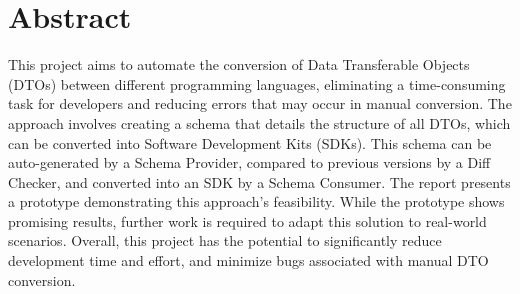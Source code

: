 \section*{Abstract}
This project aims to automate the conversion of Data Transferable Objects (DTOs) between different programming languages, eliminating a time-consuming task for developers and reducing errors that may occur in manual conversion. 
The approach involves creating a schema that details the structure of all DTOs, which can be converted into Software Development Kits (SDKs). This schema can be auto-generated by a Schema Provider, compared to previous versions by a Diff Checker, and converted into an SDK by a Schema Consumer.
\newline\newline
The report presents a prototype demonstrating this approach's feasibility. While the prototype shows promising results, further work is required to adapt this solution to real-world scenarios. Overall, this project has the potential to significantly reduce development time and effort, and minimize bugs associated with manual DTO conversion.